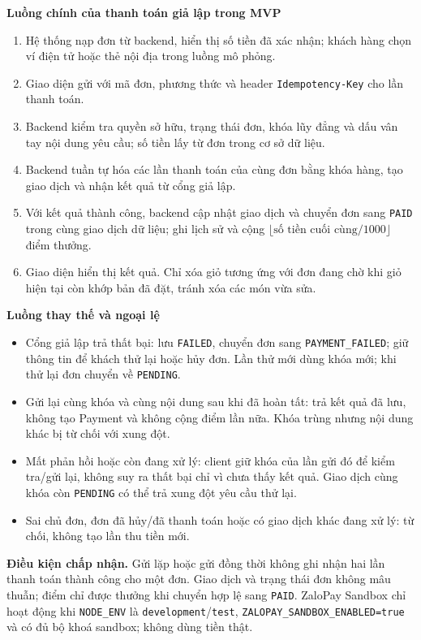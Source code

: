 \textbf{Luồng chính của thanh toán giả lập trong MVP}
\begin{enumerate}[nosep]
  \item Hệ thống nạp đơn từ backend, hiển thị số tiền đã xác nhận; khách
  hàng chọn ví điện tử hoặc thẻ nội địa trong luồng mô phỏng.
  \item Giao diện gửi  với mã đơn, phương thức
  và header \texttt{Idempotency-Key} cho lần thanh toán.
  \item Backend kiểm tra quyền sở hữu, trạng thái đơn, khóa lũy đẳng và
  dấu vân tay nội dung yêu cầu; số tiền lấy từ đơn trong cơ sở dữ liệu.
  \item Backend tuần tự hóa các lần thanh toán của cùng đơn bằng khóa
  hàng, tạo giao dịch và nhận kết quả từ cổng giả lập.
  \item Với kết quả thành công, backend cập nhật giao dịch và chuyển đơn
  sang \texttt{PAID} trong cùng giao dịch dữ liệu; ghi lịch sử và cộng
  $\lfloor\text{số tiền cuối cùng}/1000\rfloor$ điểm thưởng.
  \item Giao diện hiển thị kết quả. Chỉ xóa giỏ tương ứng với đơn đang
  chờ khi giỏ hiện tại còn khớp bản đã đặt, tránh xóa các món vừa sửa.
\end{enumerate}

\textbf{Luồng thay thế và ngoại lệ}
\begin{itemize}[nosep]
  \item Cổng giả lập trả thất bại: lưu \texttt{FAILED}, chuyển đơn sang
  \texttt{PAYMENT\_FAILED}; giữ thông tin để khách thử lại hoặc hủy đơn.
  Lần thử mới dùng khóa mới; khi thử lại đơn chuyển về \texttt{PENDING}.
  \item Gửi lại cùng khóa và cùng nội dung sau khi đã hoàn tất: trả kết
  quả đã lưu, không tạo Payment và không cộng điểm lần nữa. Khóa trùng
  nhưng nội dung khác bị từ chối với xung đột.
  \item Mất phản hồi hoặc còn đang xử lý: client giữ khóa của lần gửi
  đó để kiểm tra/gửi lại, không suy ra thất bại chỉ vì chưa thấy kết quả.
  Giao dịch cùng khóa còn \texttt{PENDING} có thể trả xung đột yêu cầu thử lại.
  \item Sai chủ đơn, đơn đã hủy/đã thanh toán hoặc có giao dịch khác đang
  xử lý: từ chối, không tạo lần thu tiền mới.
\end{itemize}

\textbf{Điều kiện chấp nhận.} Gửi lặp hoặc gửi đồng thời không ghi nhận
hai lần thanh toán thành công cho một đơn. Giao dịch và trạng thái đơn
không mâu thuẫn; điểm chỉ được thưởng khi chuyển hợp lệ sang
\texttt{PAID}. ZaloPay Sandbox chỉ hoạt động khi \texttt{NODE\_ENV} là
\texttt{development}/\texttt{test}, \texttt{ZALOPAY\_SANDBOX\_ENABLED=true}
và có đủ bộ khoá sandbox; không dùng tiền thật.


